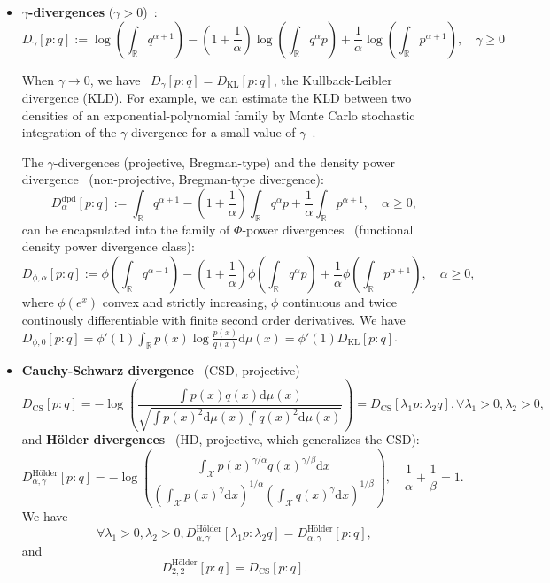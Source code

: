 \documentclass[11pt]{article}
\def\dmu{\mathrm{d}\mu}
\def\KL{\mathrm{KL}}
\def\CS{\mathrm{CS}}
\begin{document}
\begin{itemize}
\item {\bf $\gamma$-divergences} ($\gamma>0$)~\cite{gammadivergence-2001,gammadivergence-2008}:
$$
D_{\gamma}[p:q]:=\log \left(\int_{\mathbb{R}} q^{\alpha+1}\right)-\left(1+\frac{1}{\alpha}\right) \log \left(\int_{\mathbb{R}} q^{\alpha} p\right)+\frac{1}{\alpha} \log \left(\int_{\mathbb{R}} p^{\alpha+1}\right),\quad \gamma\geq 0
$$

When $\gamma\rightarrow 0$, we have~\cite{gammadivergence-2008} $D_{\gamma}[p:q]=D_\KL[p:q]$, the Kullback-Leibler divergence (KLD).
For example, we can estimate the KLD between two densities of an exponential-polynomial family by Monte Carlo stochastic integration of the $\gamma$-divergence for a small value of $\gamma$~\cite{PMPEF-2016}.

The $\gamma$-divergences (projective, Bregman-type) and the density power divergence~\cite{BasuPowerDivergence-1998} (non-projective, Bregman-type divergence):
$$
D_{\alpha}^\mathrm{dpd}[p:q]:=\int_{\mathbb{R}} q^{\alpha+1}-\left(1+\frac{1}{\alpha}\right) \int_{\mathbb{R}} q^{\alpha} p+\frac{1}{\alpha} \int_{\mathbb{R}} p^{\alpha+1},\quad \alpha\geq 0,
$$
can be encapsulated into the family of $\Phi$-power divergences~\cite{PhiPowerDivergence-2021} (functional density power divergence class):
$$
D_{\phi, \alpha}[p:q]:=\phi\left(\int_{\mathbb{R}} q^{\alpha+1}\right)-\left(1+\frac{1}{\alpha}\right) \phi\left(\int_{\mathbb{R}} q^{\alpha} p\right)+\frac{1}{\alpha} \phi\left(\int_{\mathbb{R}} p^{\alpha+1}\right),\quad \alpha\geq 0,
$$
where $\phi(e^x)$ convex and strictly increasing, $\phi$ continuous and twice continously differentiable with finite second order derivatives.
We have $D_{\phi,0}[p:q]=\phi'(1)\int_{\mathbb{R}} p(x)\log\frac{p(x)}{q(x)}\dmu(x)=\phi'(1)D_\KL[p:q]$.

\item {\bf Cauchy-Schwarz divergence}~\cite{jenssen2006cauchy} (CSD, projective)
$$
D_\CS[p:q]=-\log \left( \frac{\int p(x) q(x) \dmu(x)}{\sqrt{\int p(x)^{2}  \dmu(x) \int q(x)^{2}  \dmu(x)}} \right) = D_\CS[\lambda_1 p:\lambda_2 q], \forall \lambda_1>0,\lambda_2>0,
$$
and {\bf H\"older divergences}~\cite{HolderDivergence-2017} (HD, projective, which generalizes the CSD):
$$
D_{\alpha, \gamma}^{\mbox{H\"older}}[p:q]=
-\log \left(\frac{\int_{\mathcal{X}} p(x)^{\gamma / \alpha} q(x)^{\gamma / \beta} \mathrm{d} x}{\left(\int_{\mathcal{X}} p(x)^{\gamma} \mathrm{d} x\right)^{1 / \alpha}\left(\int_{\mathcal{X}} q(x)^{\gamma} \mathrm{d} x\right)^{1 / \beta}}\right),\quad \frac{1}{\alpha}+\frac{1}{\beta}=1 .
$$
We have
$$
\forall \lambda_1>0, \lambda_2>0, D_{\alpha, \gamma}^{\mbox{H\"older}}[\lambda_1 p:\lambda_2 q]= D_{\alpha, \gamma}^{\mbox{H\"older}}[p:q],
$$
and
$$
D_{2,2}^{\mbox{H\"older}}[p:q]=D_\CS[p:q].
$$


\end{itemize}
\end{document}
